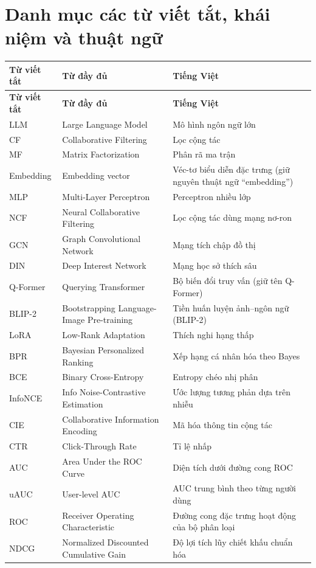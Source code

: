 \chapter*{Danh mục các từ viết tắt, khái niệm và thuật ngữ}

\renewcommand{\arraystretch}{1.3}
\begin{longtable}{|L{2.4cm}|L{5.2cm}|L{6cm}|}
\hline
\textbf{Từ viết tắt} & \textbf{Từ đầy đủ} & \textbf{Tiếng Việt} \\
\hline
\endfirsthead
\hline
\textbf{Từ viết tắt} & \textbf{Từ đầy đủ} & \textbf{Tiếng Việt} \\
\hline
\endhead
LLM & Large Language Model & Mô hình ngôn ngữ lớn \\
\hline
CF & Collaborative Filtering & Lọc cộng tác \\
\hline
MF & Matrix Factorization & Phân rã ma trận \\
\hline
Embedding & Embedding vector & Véc-tơ biểu diễn đặc trưng (giữ nguyên thuật ngữ ``embedding'') \\
\hline
MLP & Multi-Layer Perceptron & Perceptron nhiều lớp \\
\hline
NCF & Neural Collaborative Filtering & Lọc cộng tác dùng mạng nơ-ron \\
\hline
GCN & Graph Convolutional Network & Mạng tích chập đồ thị \\
\hline
DIN & Deep Interest Network & Mạng học sở thích sâu \\
\hline
Q-Former & Querying Transformer & Bộ biến đổi truy vấn (giữ tên Q-Former) \\
\hline
BLIP-2 & Bootstrapping Language-Image Pre-training & Tiền huấn luyện ảnh--ngôn ngữ (BLIP-2) \\
\hline
LoRA & Low-Rank Adaptation & Thích nghi hạng thấp \\
\hline
BPR & Bayesian Personalized Ranking & Xếp hạng cá nhân hóa theo Bayes \\
\hline
BCE & Binary Cross-Entropy & Entropy chéo nhị phân \\
\hline
InfoNCE & Info Noise-Contrastive Estimation & Ước lượng tương phản dựa trên nhiễu \\
\hline
CIE & Collaborative Information Encoding & Mã hóa thông tin cộng tác \\
\hline
CTR & Click-Through Rate & Tỉ lệ nhấp \\
\hline
AUC & Area Under the ROC Curve & Diện tích dưới đường cong ROC \\
\hline
uAUC & User-level AUC & AUC trung bình theo từng người dùng \\
\hline
ROC & Receiver Operating Characteristic & Đường cong đặc trưng hoạt động của bộ phân loại \\
\hline
NDCG & Normalized Discounted Cumulative Gain & Độ lợi tích lũy chiết khấu chuẩn hóa \\
\hline
\end{longtable}
\renewcommand{\arraystretch}{1}
\clearpage
